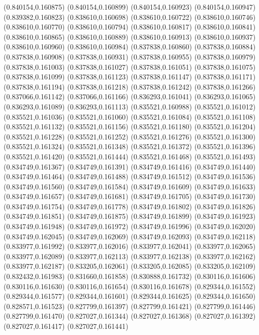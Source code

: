 (0.840154,0.160875)
(0.840154,0.160899)
(0.840154,0.160923)
(0.840154,0.160947)
(0.839382,0.160823)
(0.838610,0.160698)
(0.838610,0.160722)
(0.838610,0.160746)
(0.838610,0.160770)
(0.838610,0.160794)
(0.838610,0.160817)
(0.838610,0.160841)
(0.838610,0.160865)
(0.838610,0.160889)
(0.838610,0.160913)
(0.838610,0.160937)
(0.838610,0.160960)
(0.838610,0.160984)
(0.837838,0.160860)
(0.837838,0.160884)
(0.837838,0.160908)
(0.837838,0.160931)
(0.837838,0.160955)
(0.837838,0.160979)
(0.837838,0.161003)
(0.837838,0.161027)
(0.837838,0.161051)
(0.837838,0.161075)
(0.837838,0.161099)
(0.837838,0.161123)
(0.837838,0.161147)
(0.837838,0.161171)
(0.837838,0.161194)
(0.837838,0.161218)
(0.837838,0.161242)
(0.837838,0.161266)
(0.837066,0.161142)
(0.837066,0.161166)
(0.836293,0.161041)
(0.836293,0.161065)
(0.836293,0.161089)
(0.836293,0.161113)
(0.835521,0.160988)
(0.835521,0.161012)
(0.835521,0.161036)
(0.835521,0.161060)
(0.835521,0.161084)
(0.835521,0.161108)
(0.835521,0.161132)
(0.835521,0.161156)
(0.835521,0.161180)
(0.835521,0.161204)
(0.835521,0.161228)
(0.835521,0.161252)
(0.835521,0.161276)
(0.835521,0.161300)
(0.835521,0.161324)
(0.835521,0.161348)
(0.835521,0.161372)
(0.835521,0.161396)
(0.835521,0.161420)
(0.835521,0.161444)
(0.835521,0.161468)
(0.835521,0.161493)
(0.834749,0.161367)
(0.834749,0.161391)
(0.834749,0.161416)
(0.834749,0.161440)
(0.834749,0.161464)
(0.834749,0.161488)
(0.834749,0.161512)
(0.834749,0.161536)
(0.834749,0.161560)
(0.834749,0.161584)
(0.834749,0.161609)
(0.834749,0.161633)
(0.834749,0.161657)
(0.834749,0.161681)
(0.834749,0.161705)
(0.834749,0.161730)
(0.834749,0.161754)
(0.834749,0.161778)
(0.834749,0.161802)
(0.834749,0.161826)
(0.834749,0.161851)
(0.834749,0.161875)
(0.834749,0.161899)
(0.834749,0.161923)
(0.834749,0.161948)
(0.834749,0.161972)
(0.834749,0.161996)
(0.834749,0.162020)
(0.834749,0.162045)
(0.834749,0.162069)
(0.834749,0.162093)
(0.834749,0.162118)
(0.833977,0.161992)
(0.833977,0.162016)
(0.833977,0.162041)
(0.833977,0.162065)
(0.833977,0.162089)
(0.833977,0.162113)
(0.833977,0.162138)
(0.833977,0.162162)
(0.833977,0.162187)
(0.833205,0.162061)
(0.833205,0.162085)
(0.833205,0.162109)
(0.832432,0.161983)
(0.831660,0.161858)
(0.830888,0.161732)
(0.830116,0.161606)
(0.830116,0.161630)
(0.830116,0.161654)
(0.830116,0.161678)
(0.829344,0.161552)
(0.829344,0.161577)
(0.829344,0.161601)
(0.829344,0.161625)
(0.829344,0.161650)
(0.828571,0.161523)
(0.827799,0.161397)
(0.827799,0.161421)
(0.827799,0.161446)
(0.827799,0.161470)
(0.827027,0.161344)
(0.827027,0.161368)
(0.827027,0.161392)
(0.827027,0.161417)
(0.827027,0.161441)
